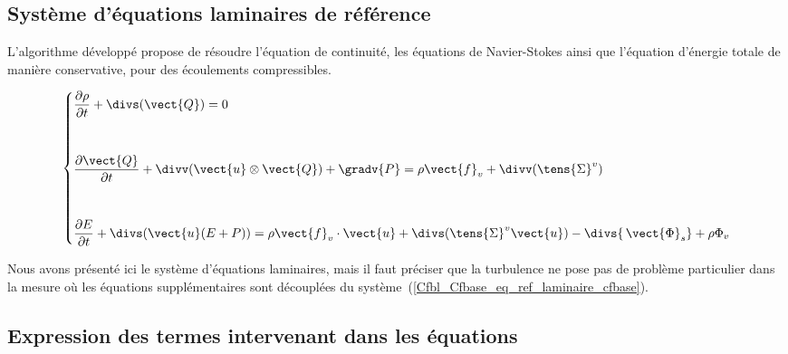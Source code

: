 \subsection*{Système d'équations laminaires de référence}

L'algorithme développé propose de résoudre
l'équation de continuité, les équations de Navier-Stokes
ainsi que l'équation d'énergie totale de manière conservative,
pour des écoulements compressibles.

\begin{equation}\label{Cfbl_Cfbase_eq_ref_laminaire_cfbase}
\left\{
\begin{aligned}
&\displaystyle\frac{\partial\rho}{\partial t} + \divs(\vect{Q}) = 0 \\[1em]
&\\
&\displaystyle\frac{\partial\vect{Q}}{\partial t}
+ \divv(\vect{u} \otimes \vect{Q}) + \gradv{P}
= \rho \vect{f}_v + \divv(\tens{\Sigma}^v) \\[1em]
&\\
&\displaystyle\frac{\partial E}{\partial t} + \divs( \vect{u} (E+P) )
= \rho\vect{f}_v\cdot\vect{u} + \divs(\tens{\Sigma}^v \vect{u})
- \divs{\,\vect{\Phi}_s} + \rho\Phi_v
\end{aligned}
\right.
\end{equation}

Nous avons présenté ici le système d'équations laminaires, mais il faut préciser
que la turbulence ne pose pas de problème particulier dans la mesure où les
équations supplémentaires sont découplées du système~(\ref{Cfbl_Cfbase_eq_ref_laminaire_cfbase}).

\subsection*{Expression des termes intervenant dans les équations}

